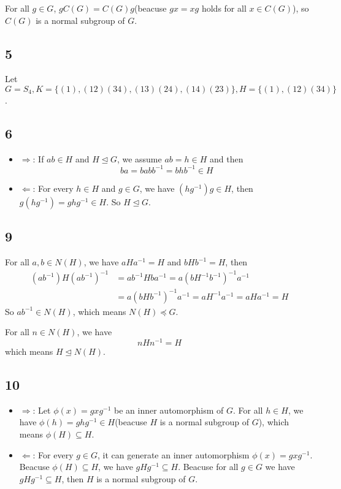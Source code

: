 \documentclass[draft]{article}
\begin{document}
			For all $g \in G$, $gC(G) = C(G)g$(beacuse $gx = xg$ holds for all $x \in
			C(G)$), so $C(G)$ is a normal subgroup of $G$.
		\subsection*{5}
			Let $G = S_4, K = \{ (1), (12)(34), (13)(24), (14)(23) \}, H = \{ (1),
			(12)(34)\}$.
		\subsection*{6}
			\begin{itemize}
				\item $\Rightarrow$:
					If $ab \in H$ and $H \unlhd G$, we assume $ab = h \in H$ and then
					$$
						ba = babb^{-1} = bhb^{-1} \in H
					$$
				\item $\Leftarrow$:
					For every $h \in H$ and $g \in G$, we have $(hg^{-1})g \in H$, then 
					$g(hg^{-1}) = ghg^{-1} \in H$. So $H \unlhd G$.
			\end{itemize}
		\subsection*{9}
			For all $a, b \in N(H)$, we have $ aHa^{-1} = H $ and $bHb^{-1} = H$, then
			\begin{equation*}
				\begin{split}
					(ab^{-1})H(ab^{-1})^{-1} &= ab^{-1}Hba^{-1} = a(bH^{-1}b^{-1})^{-1}a^{-1} \\
					& = a(bHb^{-1})^{-1}a^{-1} = aH^{-1}a^{-1} = aHa^{-1} = H
				\end{split}
			\end{equation*}
			So $ab^{-1} \in N(H)$, which means $N(H) \preceq G$.

			For all $n \in N(H)$, we have
			$$
				nHn^{-1} = H
			$$
			which means $H \unlhd N(H)$.

		\subsection*{10}
			\begin{itemize}
				\item $\Rightarrow$:
					Let $\phi(x) = gxg^{-1}$ be an inner automorphism of $G$. For all $h
					\in H$, we have $\phi(h) = ghg^{-1} \in H$(beacuse $H$ is a normal
					subgroup of $G$), which means $\phi(H) \subseteq H$.
				\item $\Leftarrow$:
					For every $g \in G$, it can generate an inner automorphism $\phi(x) =
					gxg^{-1}$. Beacuse $\phi(H) \subseteq H$, we have $gHg^{-1} \subseteq
					H$. Beacuse for all $g \in G$ we have $gHg^{-1} \subseteq H$, then $H$
					is a normal subgroup of $G$.
			\end{itemize}
\end{document}
